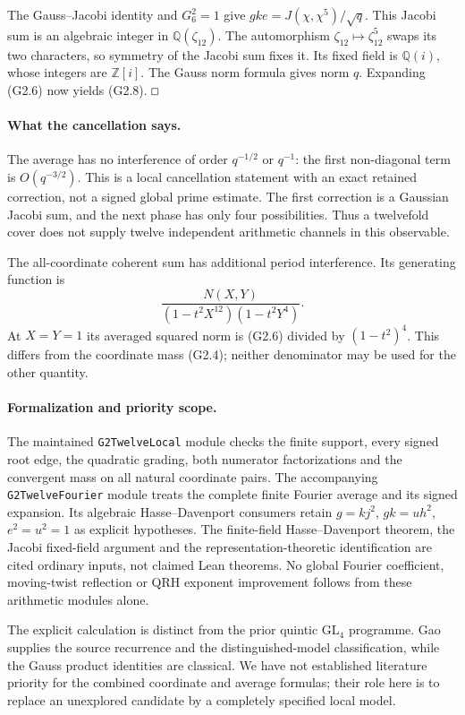 \documentclass[11pt]{article}
\renewcommand{\square}{\mathord{\vcenter{\hrule\hbox{\vrule height .45em\kern .45em\vrule}\hrule}}}
\newcommand{\QQ}{\mathbb Q}
\newcommand{\ZZ}{\mathbb Z}
\newcommand{\GL}{\mathrm{GL}}
\begin{document}
The Gauss--Jacobi identity and $G_6^2=1$ give
$gke=J(\chi,\chi^5)/\sqrt q$.
This Jacobi sum is an algebraic integer in $\QQ(\zeta_{12})$.
The automorphism $\zeta_{12}\mapsto\zeta_{12}^5$ swaps its two
characters, so symmetry of the Jacobi sum fixes it.
Its fixed field is $\QQ(i)$, whose integers are $\ZZ[i]$.
The Gauss norm formula gives norm $q$. Expanding (G2.6) now yields
(G2.8).
\hfill$\square$

\paragraph{What the cancellation says.}
The average has no interference of order $q^{-1/2}$ or $q^{-1}$:
the first non-diagonal term is $O(q^{-3/2})$.
This is a local cancellation statement with an exact retained correction,
not a signed global prime estimate. The first correction is a Gaussian
Jacobi sum, and the next phase has only four possibilities.
Thus a twelvefold cover does not supply twelve independent arithmetic
channels in this observable.

The all-coordinate coherent sum has additional period interference.
Its generating function is
\[
 \frac{N(X,Y)}{(1-t^2X^{12})(1-t^2Y^4)}.
\]
At $X=Y=1$ its averaged squared norm is (G2.6) divided by
$(1-t^2)^4$. This differs from the coordinate mass (G2.4);
neither denominator may be used for the other quantity.

\paragraph{Formalization and priority scope.}
The maintained \texttt{G2TwelveLocal} module checks the finite support,
every signed root edge, the quadratic grading, both numerator
factorizations and the convergent mass on all natural coordinate pairs.
The accompanying \texttt{G2TwelveFourier} module treats the complete
finite Fourier average and its signed expansion. Its algebraic
Hasse--Davenport consumers retain $g=kj^2$, $gk=uh^2$, $e^2=u^2=1$
as explicit hypotheses. The finite-field Hasse--Davenport theorem,
the Jacobi fixed-field argument and the representation-theoretic
identification are cited ordinary inputs, not claimed Lean theorems.
No global Fourier coefficient, moving-twist reflection or QRH exponent
improvement follows from these arithmetic modules alone.

The explicit calculation is distinct from the prior quintic
$\GL_4$ programme. Gao supplies the source recurrence and the
distinguished-model classification, while the Gauss product identities
are classical. We have not established literature priority for the
combined coordinate and average formulas; their role here is to
replace an unexplored candidate by a completely specified local model.
\end{document}
